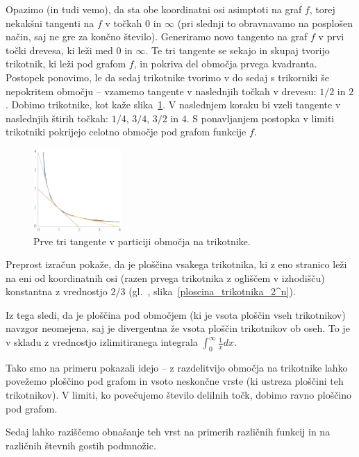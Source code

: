 \documentclass[a4paper, 12pt, titlepage]{article}
\begin{document}
Opazimo (in tudi vemo), da sta obe koordinatni osi asimptoti na graf $ f $, torej nekakšni tangenti na $ f $ v točkah $ 0 $ in $ \infty $ (pri slednji to obravnavamo na posplošen način, saj ne gre za končno število). Generiramo novo tangento na graf $ f $ v prvi točki drevesa, ki leži med $ 0 $ in $ \infty $. Te tri tangente se sekajo in skupaj tvorijo trikotnik, ki leži pod grafom $ f $, in pokriva del območja prvega kvadranta. Postopek ponovimo, le da sedaj trikotnike tvorimo v do sedaj s trikorniki še nepokritem območju -- vzamemo tangente v naslednjih točkah v drevesu: $ 1/2 $ in $ 2 $. Dobimo trikotnike, kot kaže slika~\ref{uvodni_primer_prvi_trikotniki}. V naslednjem koraku bi vzeli tangente v naslednjih štirih točkah: $ 1/4 $, $ 3/4 $, $ 3/2 $ in $ 4 $. S ponavljanjem postopka v limiti trikotniki pokrijejo celotno območje pod grafom funkcije $ f $.

\begin{figure}[H]
    \centering
    \includegraphics[width=0.3\textwidth]{slike/uvodni_primer_prvi_trikotniki.png}
    \caption{Prve tri tangente v particiji območja na trikotnike.}
    \label{uvodni_primer_prvi_trikotniki}
\end{figure}

Preprost izračun pokaže, da je ploščina vsakega trikotnika, ki z eno stranico leži na eni od koordinatnih osi (razen prvega trikotnika z ogliščem v izhodišču) konstantna z vrednostjo $ 2/3 $ (gl.~, slika~\ref{ploscina_trikotnika_2^n}).

Iz tega sledi, da je ploščina pod območjem (ki je vsota ploščin vseh trikotnikov) navzgor neomejena, saj je divergentna že vsota ploščin trikotnikov ob oseh. To je v skladu z vrednostjo izlimitiranega integrala $ \int_{0}^{\infty}\frac{1}{x}dx $.

Tako smo na primeru pokazali idejo -- z razdelitvijo območja na trikotnike lahko povežemo ploščino pod grafom in vsoto neskončne vrste (ki ustreza ploščini teh trikotnikov). V limiti, ko povečujemo število delilnih točk, dobimo ravno ploščino pod grafom.

Sedaj lahko raziščemo obnašanje teh vrst na primerih različnih funkcij in na različnih števnih gostih podmnožic.
\end{document}
